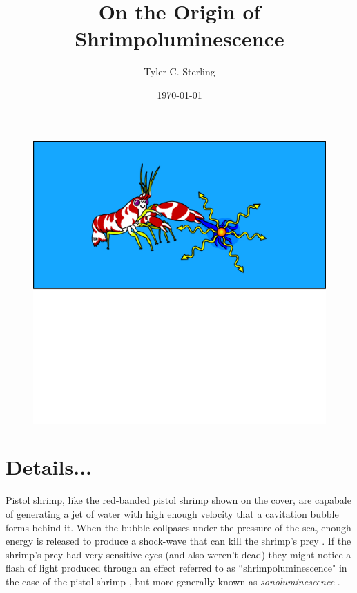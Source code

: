 \documentclass[prb,aps,12pt,superscriptaddress,floatfix]{revtex4-2}
\begin{document}
\title{\huge On the Origin of Shrimpoluminescence }

\author{\large Tyler C. Sterling}

\date{\today}


\maketitle



\begin{figure}
\includegraphics[width=1\linewidth]{figs/shrimpy2.pdf}
\label{fig:shrimpy}
\end{figure}

 
\newpage

\section{Details...}
Pistol shrimp, like the red-banded pistol shrimp shown on the cover, are capabale of generating a jet of water with high enough velocity that a cavitation bubble forms behind it. When the bubble collpases under the pressure of the sea, enough energy is released to produce a shock-wave that can kill the shrimp's prey \cite{}. If the shrimp's prey had very sensitive eyes (and also weren't dead) they might notice a flash of light produced through an effect referred to as ``shrimpoluminescence" in the case of the pistol shrimp \cite{}, but more generally known as \emph{sonoluminescence} \cite{}.
\end{document}
